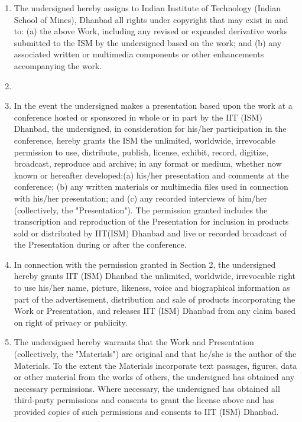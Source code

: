 \begin{enumerate}
    \item The undersigned hereby assigns to Indian Institute of Technology (Indian School of Mines), Dhanbad all rights under copyright that may exist in and to: (a) the above Work, including any revised or expanded derivative works submitted to the ISM by the undersigned based on the work; and (b) any associated written or multimedia components or other enhancements accompanying the work.\\
    
    \item[] \hspace*{1cm} 

    \item  In the event the undersigned makes a presentation based upon the work at a conference hosted or sponsored in whole or in part by the IIT (ISM) Dhanbad, the undersigned, in consideration for his/her participation in the conference, hereby grants the ISM the unlimited, worldwide, irrevocable permission to use, distribute, publish, license, exhibit, record, digitize, broadcast, reproduce and archive; in any format or medium, whether now known or hereafter developed:(a) his/her presentation and comments at the conference; (b) any written materials or multimedia files used in connection with his/her presentation; and (c) any recorded interviews of him/her (collectively, the "Presentation"). The permission granted includes the transcription 
    and reproduction of the Presentation for inclusion in products sold or distributed by IIT(ISM) Dhanbad and live or recorded broadcast of the Presentation during or after the conference.
    \\  
    \newpage
    \thispagestyle{otherpages} %
    \item In connection with the permission granted in Section 2, the undersigned hereby grants IIT (ISM) Dhanbad the unlimited, worldwide, irrevocable right to use his/her name, picture, likeness, voice and biographical information as part of the advertisement, distribution and sale of products incorporating the Work or Presentation, and releases IIT (ISM) Dhanbad from any claim based on right of privacy or publicity.

    \item  The undersigned hereby warrants that the Work and Presentation (collectively, the "Materials") are original and that he/she is the author of the Materials. To the extent the Materials incorporate text passages, figures, data or other material from the works of others, the undersigned has obtained any necessary permissions. Where necessary, the undersigned has obtained all third-party permissions and consents to grant the license above and has provided copies of such permissions and consents to IIT (ISM) Dhanbad.

\end{enumerate}



